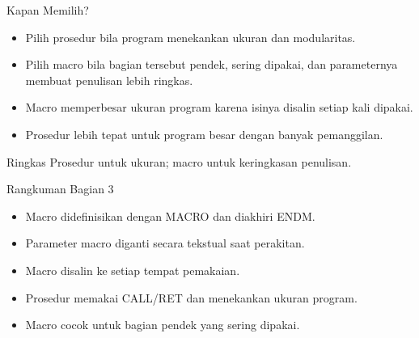 \documentclass[aspectratio=169,11pt]{beamer}
\begin{document}
\begin{frame}{Kapan Memilih?}
\small
\begin{itemize}
    \item Pilih prosedur bila program menekankan ukuran dan
          modularitas.

    \vspace{0.18em}
    \item Pilih macro bila bagian tersebut pendek, sering dipakai,
          dan parameternya membuat penulisan lebih ringkas.

    \vspace{0.18em}
    \item Macro memperbesar ukuran program karena isinya disalin
          setiap kali dipakai.

    \vspace{0.18em}
    \item Prosedur lebih tepat untuk program besar dengan banyak
          pemanggilan.
\end{itemize}

\vspace{0.2em}
\begin{block}{Ringkas}
\small Prosedur untuk ukuran; macro untuk keringkasan penulisan.
\end{block}
\end{frame}

\begin{frame}{Rangkuman Bagian 3}
\small
\begin{itemize}
    \item Macro didefinisikan dengan MACRO dan diakhiri ENDM.

    \vspace{0.15em}
    \item Parameter macro diganti secara tekstual saat perakitan.

    \vspace{0.15em}
    \item Macro disalin ke setiap tempat pemakaian.

    \vspace{0.15em}
    \item Prosedur memakai CALL/RET dan menekankan ukuran program.

    \vspace{0.15em}
    \item Macro cocok untuk bagian pendek yang sering dipakai.
\end{itemize}
\end{frame}
\end{document}
